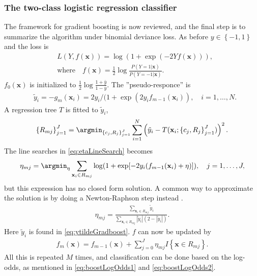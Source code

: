 \subsubsection{The two-class logistic regression classifier}
\label{sub:The two-class logistic regression classifier}
The framework for gradient boosting is now reviewed, and the final step is to summarize the algorithm under binomial deviance loss. As before $y \in \left\{ -1, 1 \right\}$ and the loss is 
\begin{align}
  &L(Y, f(\mathbf{x})) = \log (1 + \exp (-2 Y f(\mathbf{x}))),\\
  &\text{where} \quad f(\mathbf{x}) = \frac{1}{2} \log \frac{ P(Y = 1 | \mathbf{x})}{ P(Y = -1 | \mathbf{x})}  .
\end{align}
$f_0(\mathbf{x})$ is initialized to $\frac{1}{2} \log \frac{1+\bar{y}}{1-\bar{y}}$.  The ''pseudo-responce'' is
\begin{align}
  \label{eq:ytildeGradboost} 
  &\tilde{y}_i = -g_m(\mathbf{x}_i) = 2 y_i / (1 + \exp \left( 2 y_i f_{m-1}(\mathbf{x}_i) \right), \quad i = 1, \ldots, N.
\end{align}
A regression tree $T$ is fitted to $\tilde y_i$,
\begin{align}
  \left\{ R_{m j} \right\}_{j = 1}^J  = 
  \argmin_{\left\{ c_j, R_{j} \right\}_{j = 1}^J} \sum^{N}_{i=1} \left( \tilde y_i - T(\mathbf{x}_i; \left\{ c_j, R_j \right\}_{j = 1}^J) \right)^2.
\end{align}
The line searches in \eqref{eq:etaLineSearch} becomes
\begin{align}
  \eta_{m j} = \argmin_\eta  \sum_{\mathbf{x}_i \in R_{m j}} \log (1 + \exp [-2 y_i (f_{m-1}(\mathbf{x}_i) + \eta) ]), \quad j = 1, \ldots, J,
\end{align}
but this expression has no closed form solution. A common way to approximate the solution is by doing a Newton-Raphson step instead \cite{friedman}.
\begin{align}
  \eta_{m j} =  \frac{\sum_{\mathbf{x}_i \in R_{m j}} \tilde y_i}{\sum_{\mathbf{x}_i \in R_{m j}} |\tilde y_i|(2-|\tilde y_i|)}.
\end{align}
Here  $\tilde y_i$ is found in \eqref{eq:ytildeGradboost}. $f$ can now be updated by
\begin{align}
  \label{eq:gradBoostUpdateF} 
  f_m(\mathbf{x}) = f_{m-1}(\mathbf{x}) +  \sum^{J}_{j=0} \eta_{m j} I\left\{ \mathbf{x} \in R_{m j} \right\}.
\end{align}
All this is repeated $M$ times, and classification can be done based on the log-odds, as mentioned in \eqref{eq:boostLogOdds1} and \eqref{eq:boostLogOdds2}. \\
